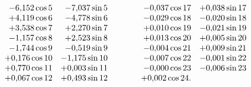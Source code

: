 \begin{landscape}
\[\begin{array}{@{}r@{\quad}r@{\qquad\qquad}r@{\quad}r@{}}
-6{,}152\cos 5&-7{,}037\sin 5&-0{,}037\cos 17&+0{,}038\sin 17\\
+4{,}119\cos 6&-4{,}778\sin 6&-0{,}029\cos 18&-0{,}020\sin 18\\
+3{,}538\cos 7&+2{,}270\sin 7&+0{,}010\cos 19&-0{,}021\sin 19\\
-1{,}157\cos 8&+2{,}523\sin 8&+0{,}013\cos 20&+0{,}005\sin 20\\
-1{,}744\cos 9&-0{,}519\sin 9&-0{,}004\cos 21&+0{,}009\sin 21\\
+0{,}176\cos 10&-1{,}175\sin 10&-0{,}007\cos 22&-0{,}001\sin 22\\
+0{,}770\cos 11&+0{,}003\sin 11&-0{,}000\cos 23&-0{,}006\sin 23\\
+0{,}067\cos 12&+0{,}493\sin 12&+0{,}002\cos 24.&
\end{array}
\]
\clearpage
\endgroup
\end{landscape}
